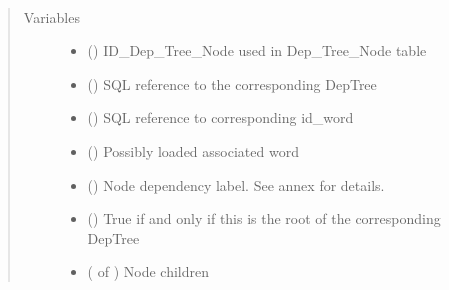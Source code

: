 \documentclass[letterpaper,10pt,english]{sphinxmanual}
\begin{document}
\begin{fulllineitems}
\label{\detokenize{classes:loacore.classes.classes.DepTreeNode}}~\begin{quote}\begin{description}
\item[{Variables}] \leavevmode\begin{itemize}
\item {} 
 () \textendash{} ID\_Dep\_Tree\_Node used in Dep\_Tree\_Node table

\item {} 
 () \textendash{} SQL reference to the corresponding DepTree

\item {} 
 () \textendash{} SQL reference to corresponding id\_word

\item {} 
 ({\hyperref[\detokenize{classes:loacore.classes.classes.Word}]{}}) \textendash{} Possibly loaded associated word

\item {} 
 () \textendash{} Node dependency label. See annex for details.

\item {} 
 () \textendash{} True if and only if this is the root of the corresponding DepTree

\item {} 
 ( of {\hyperref[\detokenize{classes:loacore.classes.classes.DepTreeNode}]{}}) \textendash{} Node children

\end{itemize}

\end{description}\end{quote}

\end{fulllineitems}
\end{document}
